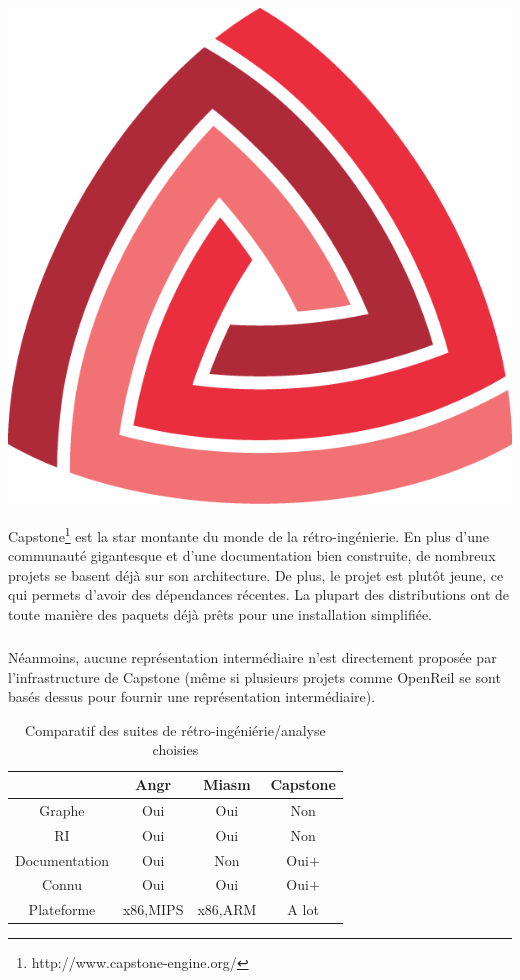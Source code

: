 \begin{center}
\includegraphics[scale=0.3]{capstone.png}
\end{center}
Capstone\footnote{http://www.capstone-engine.org/} est la star montante du monde de la rétro-ingénierie. En plus d'une communauté gigantesque et d'une
documentation bien construite, de nombreux projets se basent déjà sur son architecture. De plus, le projet est plutôt jeune, ce qui permets d'avoir des
dépendances récentes. La plupart des distributions ont de toute manière des paquets déjà prêts pour une installation simplifiée.
\subparagraph{}
Néanmoins, aucune représentation intermédiaire n'est directement proposée par l'infrastructure de Capstone (même si plusieurs projets comme OpenReil se sont basés
dessus pour fournir une représentation intermédiaire).



\begin{table}[h]
    \centering
    \caption{Comparatif des suites de rétro-ingéniérie/analyse choisies}
    \label{itd}
    \begin{tabular}{c|c|c|c}
                      & Angr     & Miasm   & Capstone \\
        \hline
        Graphe        & Oui      & Oui     & Non      \\
        \hline
        RI            & Oui      & Oui     & Non      \\
        \hline
        Documentation & Oui      & Non     & Oui+     \\
        \hline
        Connu         & Oui      & Oui     & Oui+     \\
        \hline
        Plateforme    & x86,MIPS & x86,ARM & A lot
    \end{tabular}
\end{table}


